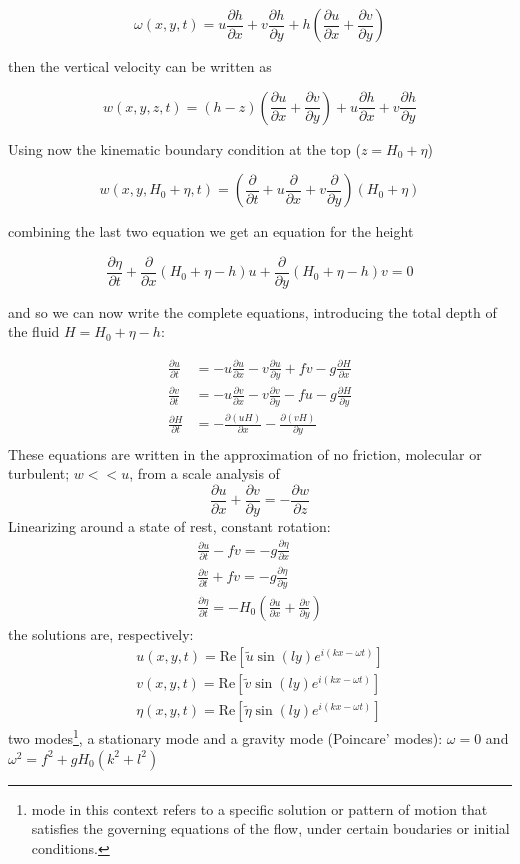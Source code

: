 \[\omega(x,y,t) = u\frac{\partial h}{\partial x} + v\frac{\partial h}{\partial y} + h \left(\frac{\partial u}{\partial x} + \frac{\partial v}{\partial y}\right)\]

then the vertical velocity can be written as

\[w(x,y,z,t) = (h-z)\left(\frac{\partial u}{\partial x} + \frac{\partial v}{\partial y}\right) + u\frac{\partial h}{\partial x} + v\frac{\partial h}{\partial y}\]

Using now the kinematic boundary condition at the top (\(z=H_0+\eta\))

\[w(x,y,H_0+\eta,t) = \left(\frac{\partial }{\partial t} + u\frac{\partial }{\partial x} + v\frac{\partial }{\partial y}\right)(H_0+\eta)\]

combining the last two equation we get an equation for the height

\[\frac{\partial \eta}{\partial t} + \frac{\partial }{\partial x}(H_0+\eta -h)u + \frac{\partial }{\partial y}(H_0+\eta -h)v = 0\]

and so we can now write the complete equations, introducing the total
depth of the fluid \(H=H_0+\eta -h\):

\[\begin{aligned}
		\frac{\partial u}{\partial t} & = -u \frac{\partial u}{\partial x} -v \frac{\partial u}{\partial y} + f v -g\frac{\partial H}{\partial x} \\
		\frac{\partial v}{\partial t} & = -u \frac{\partial v}{\partial x} -v \frac{\partial v}{\partial y} - f u -g\frac{\partial H}{\partial y} \\
		\frac{\partial H}{\partial t} & = - \frac{\partial (u H)}{\partial x} - \frac{\partial (v H)}{\partial y}                                 \\
	\end{aligned}\]
These equations are written in the approximation of no friction, molecular or turbulent; $w<<u$, from a scale analysis of $$\frac{\partial u}{\partial x}+\frac{\partial v}{\partial y}=-\frac{\partial w}{\partial z}$$
Linearizing around a state of rest, constant rotation:
\begin{align*}
	\frac{\partial u}{\partial t}-fv=-g\frac{\partial\eta}{\partial x} \\
	\frac{\partial v}{\partial t}+fv=-g\frac{\partial\eta}{\partial y} \\
	\frac{\partial\eta}{\partial t}=-H_0\left(\frac{\partial u}{\partial x}+\frac{\partial v}{\partial y}\right)
\end{align*}
the solutions are, respectively:
\begin{align*}
	u(x,y,t)=\text{Re}\left[\tilde{u}\sin(ly)e^{i(kx-\omega t)}\right] \\
	v(x,y,t)=\text{Re}\left[\tilde{v}\sin(ly)e^{i(kx-\omega t)}\right] \\
	\eta(x,y,t)=\text{Re}\left[\tilde{\eta}\sin(ly)e^{i(kx-\omega t)}\right]
\end{align*}
two modes\footnote{mode in this context refers to a specific solution or pattern of motion that satisfies the governing equations of the flow, under certain boudaries or initial conditions.}, a stationary mode and a gravity mode (Poincare' modes): $\omega=0$ and $\omega^2=f^2+gH_0(k^2+l^2)$


